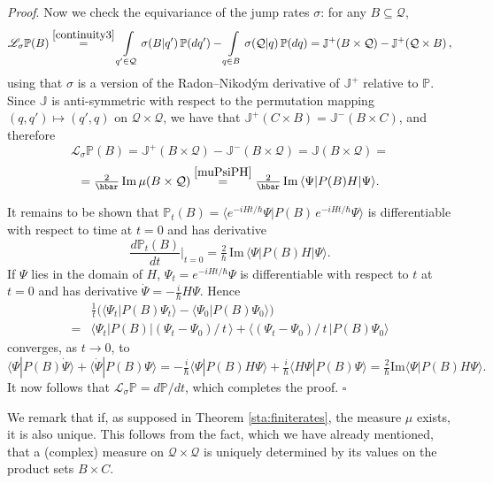 \documentclass[12pt]{article}
\newcommand{\E}{e} %
\newcommand{\I}{i} %
\newcommand{\1}{\mathbf{1}} %
\renewcommand{\Im}{\mathrm{Im}} %
\renewcommand{\sp}[2]{\langle #1 | #2 \rangle} %
\newcommand{\conf}{\mathcal{Q}} %
\newcommand{\measure}{\mathbb{P}} %
\newcommand{\current}{\mathbb{J}}
\newcommand{\generator}{\mathscr{L}} %
\newcommand{\pov}{{P}}%
\newenvironment{proof}{\noindent 
\textit{Proof}.}{\hfill$\square$\bigskip}
\begin{document}
\begin{proof}
Now we check the  equivariance of the jump rates $\sigma$: for any
$B\subseteq \conf$,
\[
   \generator_\sigma \measure (B) \stackrel{\eqref{continuity3}}{=}
   \int\limits_{q'\in\conf} \sigma(B|q') \, \measure(dq') -
   \int\limits_{q\in B} \sigma(\conf|q) \, \measure(dq) =
   \current^+(B\times\conf) - \current^+(\conf\times B)\,,
\]
using that $\sigma$ is a version of the Radon--Nikod\'ym derivative of
$\current^+$ relative to $\measure$. Since $\current$ is anti-symmetric
with respect to the permutation mapping $(q,q') \mapsto (q',q)$ on
$\conf \times \conf$, we have that  $\current^+(C \times B) = \current^-
(B
\times C)$, and therefore
\[
   \generator_\sigma \measure (B) = \current^+(B\times\conf) -
   \current^-(B\times \conf) = \current(B\times\conf) =
\]
\[
   = \tfrac{2}{\hbar} \, \Im \, \mu(B \times \conf)
   \stackrel{\eqref{muPsiPH}}{=} \tfrac{2}{\hbar} \, \Im \, \sp{\Psi}
   {\pov(B) H |\Psi}.
\]

  It remains to be shown that $\measure_t(B) = \sp{\E^{-\I Ht/\hbar}
\Psi}{\pov(B) \, \E^{-\I Ht/\hbar} \Psi}$ is differentiable with
respect to time at $t=0$ and has derivative
\begin{equation}
   \frac{d\measure_t(B)}{dt} \Big|_{t=0} = \tfrac{2}{\hbar} \, \Im \,
   \sp{\Psi}{\pov(B) H|\Psi}.
\end{equation}
If $\Psi$ lies in the domain of $H$, $\Psi_t = \E^{-\I Ht/\hbar} \Psi$
is differentiable with respect to $t$ at $t=0$ \cite[p.~265]{RS} and
has derivative $\dot{\Psi} = -\frac{\I}{\hbar} H\Psi$. Hence
\begin{align}
   &\frac{1}{t} \Big( \sp{\Psi_t}{\pov(B) \Psi_t}
   - \sp{\Psi_0}{\pov(B) \Psi_0} \Big) \nonumber \\
   =&
   \sp{\Psi_t}{ \pov(B) |(\Psi_t -\Psi_0)/\,t\,} +
   \sp{(\Psi_t -\Psi_0)/\,t\,}{ \pov(B) \Psi_0}  \nonumber
\end{align}
converges, as $t \to 0$, to
\[
   \sp{\Psi}{\pov(B) \dot{\Psi}} + \sp{\dot{\Psi}} {\pov(B) \Psi} =
   -\tfrac{\I}{\hbar} \sp{\Psi}{\pov(B) H \Psi} + \tfrac{\I}{\hbar}
   \sp{H\Psi}{\pov(B) \Psi} = \tfrac{2}{\hbar} \Im \sp{\Psi}{\pov(B) H
   \Psi}.
\]
It now follows that $\generator_\sigma \measure = d\measure/dt$, which
completes the proof.
\end{proof}

We remark that if, as supposed in Theorem \ref{sta:finiterates}, the
measure $\mu$ exists, it is also unique. This follows from the fact,
which we have already mentioned, that a (complex) measure on $\conf
\times \conf$ is uniquely determined by its values on the product sets
$B \times C$.
\end{document}
